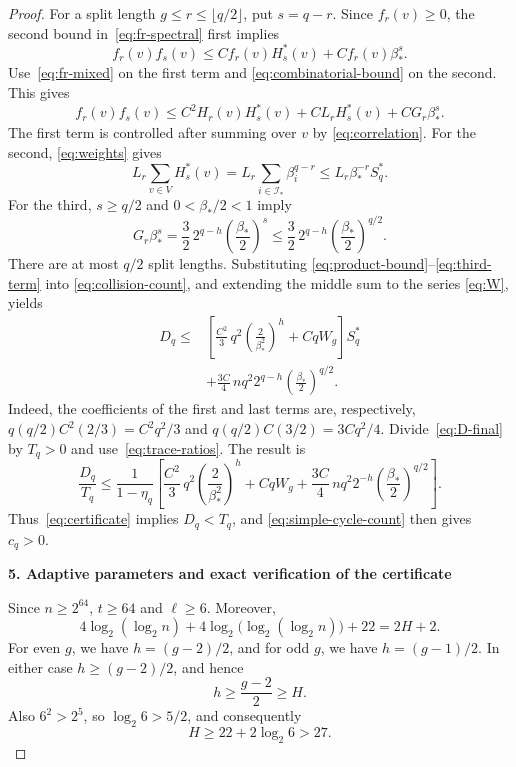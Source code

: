 \documentclass[11pt,a4paper]{article}
\newcommand{\Is}{\mathcal I_*}
\newcommand{\proofstep}[1]{%
  \par\addvspace{1.0\baselineskip}%
  \noindent\textbf{#1}\par\nobreak\smallskip\noindent\ignorespaces}
\begin{document}
\begin{proof}
For a split length $g\le r\le\lfloor q/2\rfloor$, put $s=q-r$.
Since $f_r(v)\ge0$, the second bound in~\eqref{eq:fr-spectral} first
implies
\[
 f_r(v)f_s(v)
 \le C f_r(v)H_s^*(v)+C f_r(v)\beta_*^s.
\]
Use~\eqref{eq:fr-mixed} on the first term and
\eqref{eq:combinatorial-bound} on the second. This gives
\begin{equation}\label{eq:product-bound}
 f_r(v)f_s(v)
 \le C^2H_r(v)H_s^*(v)
    +CL_rH_s^*(v)+CG_r\beta_*^s.
\end{equation}
The first term is controlled after summing over $v$ by
\eqref{eq:correlation}. For the second, \eqref{eq:weights} gives
\begin{equation}\label{eq:second-term}
 L_r\sum_{v\in V}H_s^*(v)
 =L_r\sum_{i\in\Is}\beta_i^{q-r}
 \le L_r\beta_*^{-r}S_q^*.
\end{equation}
For the third, $s\ge q/2$ and $0<\beta_*/2<1$ imply
\begin{equation}\label{eq:third-term}
 G_r\beta_*^s
 =\frac32\,2^{q-h}\left(\frac{\beta_*}{2}\right)^s
 \le\frac32\,2^{q-h}\left(\frac{\beta_*}{2}\right)^{q/2}.
\end{equation}
There are at most $q/2$ split lengths. Substituting
\eqref{eq:product-bound}--\eqref{eq:third-term} into
\eqref{eq:collision-count}, and extending the middle sum to the series
\eqref{eq:W}, yields
\begin{equation}\label{eq:D-final}
 \begin{split}
 D_q\le{}&
 \left[\frac{C^2}{3}\,q^2
              \left(\frac2{\beta_*^2}\right)^h+CqW_g\right]S_q^*\\
 &+\frac{3C}{4}\,nq^2 2^{q-h}
                 \left(\frac{\beta_*}{2}\right)^{q/2}.
 \end{split}
\end{equation}
Indeed, the coefficients of the first and last terms are, respectively,
$q(q/2)C^2(2/3)=C^2q^2/3$ and
$q(q/2)C(3/2)=3Cq^2/4$.
Divide~\eqref{eq:D-final} by $T_q>0$ and use~\eqref{eq:trace-ratios}.
The result is
\begin{equation}\label{eq:collision-ratio}
 \frac{D_q}{T_q}
 \le\frac{1}{1-\eta_q}
 \left[
 \frac{C^2}{3}\,q^2\left(\frac2{\beta_*^2}\right)^h
 +CqW_g
 +\frac{3C}{4}\,nq^2 2^{-h}
          \left(\frac{\beta_*}{2}\right)^{q/2}
 \right].
\end{equation}
Thus~\eqref{eq:certificate} implies $D_q<T_q$, and
\eqref{eq:simple-cycle-count} then gives $c_q>0$.

\proofstep{5. Adaptive parameters and exact verification of the certificate}
Since $n\ge2^{64}$,
$t\ge64$ and $\ell\ge6$. Moreover,
\[
 4\log_2(\log_2 n)
 +4\log_2\bigl(\log_2(\log_2 n)\bigr)+22
 =2H+2.
\]
For even $g$, we have $h=(g-2)/2$, and for odd $g$, we have
$h=(g-1)/2$. In either case $h\ge(g-2)/2$, and hence
\begin{equation}\label{eq:h-lower}
 h\ge\frac{g-2}{2}\ge H.
\end{equation}
Also $6^2>2^5$, so $\log_2 6>5/2$, and consequently
\begin{equation}\label{eq:H-lower}
 H\ge22+2\log_2 6>27.
\end{equation}


\end{proof}
\end{document}

